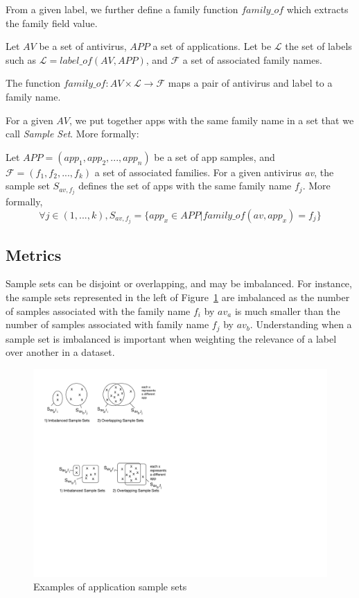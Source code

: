 From a given label, we further define a family function $family\_of$ which extracts the family field value.

\begin{definition}
	Let $AV$ be a set of antivirus, $APP$ a set of applications. Let be $\mathcal{L}$ the set of labels such as $\mathcal{L}= label\_of(AV,APP)$,
	and $\mathcal{F}$ a set of associated family names.

	The function $family\_of:AV \times \mathcal{L} \rightarrow \mathcal{F}$ maps a pair of antivirus and label to a family name.
\end{definition}

For a given $AV$, we put together apps with the same family name in a set that we call \emph{Sample Set}.
More formally:

\begin{definition}
	Let $APP=(app_1, app_2,... , app_n)$ be a set of app samples, and $\mathcal{F}=(f_1, f_2, ..., f_k)$ a set of associated families.
	For a given antivirus \emph{av}, the sample set $S_{av,f_j}$ defines the set of apps with the same family name $f_j$.
	More formally,
	\[
		\forall j \in (1,...,k), S_{av,f_j} = \{app_x \in APP | family\_of(av,app_x) = f_j\}
	\]
\end{definition}

\subsection{Metrics}
Sample sets can be disjoint or overlapping, and may be imbalanced.
For instance, the sample sets represented in the left of Figure~\ref{figure:euphony:samples} are imbalanced as the number of samples associated with the family name $f_i$ by $av_a$ is much smaller than the number of samples associated with family name $f_j$ by $av_b$.
Understanding when a sample set is imbalanced is important when weighting the relevance of a label over another in a dataset.

\begin{figure}[!ht]
        \centering
	\includegraphics[width=0.8\linewidth]{figures/euphony/samples.pdf}
	\caption{Examples of application sample sets}
	\label{figure:euphony:samples}
\end{figure}

